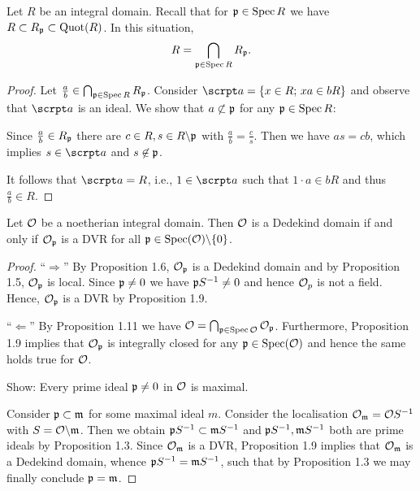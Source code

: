 \begin{Prop}
Let $R$ be an integral domain. Recall that for $\mathfrak{p} \in \operatorname{Spec} R$ we have $R \subset R_{\mathfrak{p}} \subset \operatorname{Quot}(R)$. In this situation,
\[ R = \bigcap_{\mathfrak{p}\in\operatorname{Spec} R} R_{\mathfrak{p}}.
\]
\end{Prop}

\begin{proof}
	Let $\frac{a}{b} \in \bigcap_{\mathfrak{p}\in\operatorname{Spec} R} R_{\mathfrak{p}}$. Consider $\a = \{x \in R; \, xa \in bR \}$ and observe that $\a$ is an ideal. We show that $a \not \subset \mathfrak{p}$ for any $\mathfrak{p} \in \operatorname{Spec} R$:
	
	Since $\frac{a}{b} \in R_{\mathfrak{p}}$ there are $c \in R, s \in R \backslash \mathfrak{p}$ with $\frac{a}{b} = \frac{c}{s}$.
	Then we have $as = cb$, which implies $s \in \a$ and $s \not \in \mathfrak{p}$.
	
	\bigskip It follows that $\a = R$, i.e., $1 \in \a $ such that $1\cdot a \in bR$ and thus $\frac{a}{b} \in R$.
\end{proof}

\begin{Satz} 
	Let $\mathcal{O}$ be a noetherian integral domain. Then $\mathcal{O}$ is a Dedekind domain if and only if $\mathcal{O}_{\mathfrak{p}}$ is a DVR for all $\mathfrak{p} \in \operatorname{Spec}(\mathcal{O}) \backslash \{ 0 \}$.
\end{Satz}

\begin{proof}
\enquote{$\Rightarrow$} 
By Proposition 1.6, $\mathcal{O}_{\mathfrak{p}}$ is a Dedekind domain and by Proposition 1.5, $\mathcal{O}_{\mathfrak{p}}$ is local.
Since $\mathfrak{p} \neq 0$ we have $\mathfrak{p} S^{-1} \neq 0$ and hence $\mathcal{O}_p$ is not a field. Hence, $\mathcal{O}_{\mathfrak{p}}$ is a DVR by Proposition 1.9.

\bigskip \enquote{$\Leftarrow$}
By Proposition 1.11 we have $\mathcal{O} = \bigcap_{\mathfrak{p}\in\operatorname{Spec} \mathcal{O}} \mathcal{O}_{\mathfrak{p}}$. Furthermore, Proposition 1.9 implies that $\mathcal{O}_{\mathfrak{p}}$ is integrally closed for any $\mathfrak{p} \in \operatorname{Spec}(\mathcal{O})$ and hence the same holds true for $\mathcal{O}$.

\bigskip
Show: Every prime ideal $\mathfrak{p} \neq 0$ in $\mathcal{O}$ is maximal.

Consider $\mathfrak{p} \subset \mathfrak{m}$ for some maximal ideal $m$. Consider the localisation $\mathcal{O}_{\mathfrak{m}} = \mathcal{O} S^{-1}$ with $S = \mathcal{O} \backslash \mathfrak{m}$. Then we obtain $\mathfrak{p} S^{-1} \subset \mathfrak{m} S^{-1}$ and $\mathfrak{p} S^{-1}, \mathfrak{m} S^{-1}$ both are prime ideals by Proposition 1.3.
Since $\mathcal{O}_{\mathfrak{m}}$ is a DVR, Proposition 1.9 implies that $\mathcal{O}_{\mathfrak{m}}$ is a Dedekind domain, whence
$\mathfrak{p} S^{-1} = \mathfrak{m} S^{-1}$, such that by Proposition 1.3 we may finally conclude $\mathfrak{p} = \mathfrak{m}$.
\end{proof}














